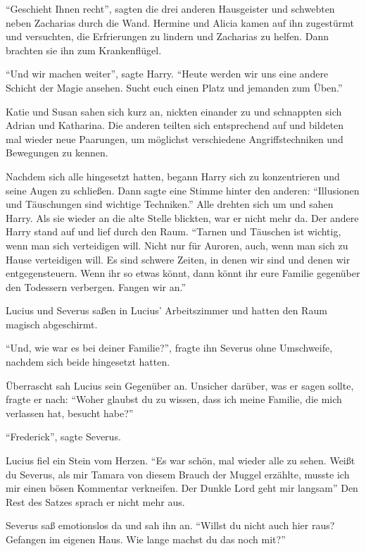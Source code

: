 \enquote{Geschieht Ihnen recht}, sagten die drei anderen Hausgeister und schwebten neben Zacharias durch die Wand. Hermine und Alicia kamen auf ihn zugestürmt und versuchten, die Erfrierungen zu lindern und Zacharias zu helfen. Dann brachten sie ihn zum Krankenflügel.

\enquote{Und wir machen weiter}, sagte Harry. \enquote{Heute werden wir uns eine andere Schicht der Magie ansehen. Sucht euch einen Platz und jemanden zum Üben.}

Katie und Susan sahen sich kurz an, nickten einander zu und schnappten sich Adrian und Katharina. Die anderen teilten sich entsprechend auf und bildeten mal wieder neue Paarungen, um möglichst verschiedene Angriffstechniken und Bewegungen zu kennen.

Nachdem sich alle hingesetzt hatten, begann Harry sich zu konzentrieren und seine Augen zu schließen. Dann sagte eine Stimme hinter den anderen: \enquote{Illusionen und Täuschungen sind wichtige Techniken.} Alle drehten sich um und sahen Harry. Als sie wieder an die alte Stelle blickten, war er nicht mehr da. Der andere Harry stand auf und lief durch den Raum. \enquote{Tarnen und Täuschen ist wichtig, wenn man sich verteidigen will. Nicht nur für Auroren, auch, wenn man sich zu Hause verteidigen will. Es sind schwere Zeiten, in denen wir sind und denen wir entgegensteuern. Wenn ihr so etwas könnt, dann könnt ihr eure Familie gegenüber den Todessern verbergen. \gst Fangen wir an.}

\trenn

Lucius und Severus saßen in Lucius’ Arbeitszimmer und hatten den Raum magisch abgeschirmt.

\enquote{Und, wie war es bei deiner Familie?}, fragte ihn Severus ohne Umschweife, nachdem sich beide hingesetzt hatten.

Überrascht sah Lucius sein Gegenüber an. Unsicher darüber, was er sagen sollte, fragte er nach: \enquote{Woher glaubst du zu wissen, dass ich meine Familie, die mich verlassen hat, besucht habe?}

\enquote{Frederick}, sagte Severus.

Lucius fiel ein Stein vom Herzen. \enquote{Es war schön, mal wieder alle zu sehen. Weißt du Severus, als mir Tamara von diesem Brauch der Muggel erzählte, musste ich mir einen bösen Kommentar verkneifen. Der Dunkle Lord geht mir langsam\abs} Den Rest des Satzes sprach er nicht mehr aus.

Severus saß emotionslos da und sah ihn an. \enquote{Willst du nicht auch hier raus? Gefangen im eigenen Haus. Wie lange machst du das noch mit?}

